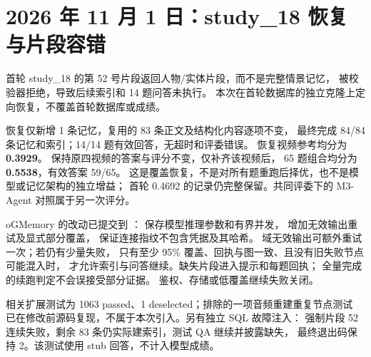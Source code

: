 \section{2026 年 11 月 1 日：study\_18 恢复与片段容错}
首轮 study\_18 的第 52 号片段返回人物/实体片段，而不是完整情景记忆，
被校验器拒绝，导致后续索引和 14 题问答未执行。
本次在首轮数据库的独立克隆上定向恢复，不覆盖首轮数据库或成绩。

恢复仅新增 1 条记忆，复用的 83 条正文及结构化内容逐项不变，
最终完成 84/84 条记忆和索引；14/14 题有效回答，无超时和评委错误。
恢复视频参考均分为 \textbf{0.3929}。
保持原四视频的答案与评分不变，仅补齐该视频后，
65 题组合均分为 \textbf{0.5538}，有效答案 59/65。
这是覆盖恢复，不是对所有题重跑后择优，也不是模型或记忆架构的独立增益；
首轮 0.4692 的记录仍完整保留。共同评委下的 M3-Agent 对照属于另一次评分。

oGMemory 的改动已提交到 ：
 保存模型推理参数和有界并发，
 增加无效输出重试及显式部分覆盖，
 保证连接指纹不包含凭据及其哈希。
域无效输出可额外重试一次；若仍有少量失败，
只有至少 95\% 覆盖、回执与图一致、且没有旧失败节点可能混入时，
才允许索引与问答继续。缺失片段进入提示和每题回执；
全量完成的续跑判定不会误接受部分证据。
鉴权、存储或低覆盖继续失败关闭。

相关扩展测试为 1063 passed、1 deselected；排除的一项音频重建重复节点测试
已在修改前源码复现，不属于本次引入。另有独立 SQL 故障注入：
强制片段 52 连续失败，剩余 83 条仍实际建索引，测试 QA 继续并披露缺失，
最终退出码保持 2。该测试使用 stub 回答，不计入模型成绩。
